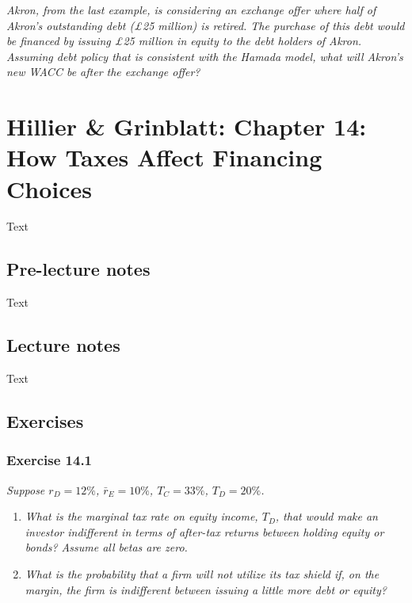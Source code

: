 \documentclass[]{book}
\theoremstyle{definition}
\theoremstyle{definition}
\theoremstyle{remark}
\begin{document}
\emph{Akron, from the last example, is considering an exchange offer
where half of Akron's outstanding debt (£25 million) is retired. The
purchase of this debt would be financed by issuing £25 million in equity
to the debt holders of Akron. Assuming debt policy that is consistent
with the Hamada model, what will Akron's new WACC be after the exchange
offer?} \citep[p.460]{book}

\chapter{Hillier \& Grinblatt: Chapter 14: How Taxes Affect Financing
Choices}\label{hillier-grinblatt-chapter-14-how-taxes-affect-financing-choices}

Text

\section{Pre-lecture notes}\label{pre-lecture-notes-13}

Text

\section{Lecture notes}\label{lecture-notes-13}

Text

\section{Exercises}\label{exercises-13}

\subsection{Exercise 14.1}\label{exercise-14.1}

\emph{Suppose \(r_D=12\%\), \(\bar{r}_E=10\%\), \(T_C=33\%\),
\(T_D=20\%\).} \citep[p.492]{book}

\begin{enumerate}
\def\labelenumi{\alph{enumi}.}
\item
  \emph{What is the marginal tax rate on equity income, \(T_D\), that
  would make an investor indifferent in terms of after-tax returns
  between holding equity or bonds? Assume all betas are zero.}
  \citep[p.492]{book}
\item
  \emph{What is the probability that a firm will not utilize its tax
  shield if, on the margin, the firm is indifferent between issuing a
  little more debt or equity?} \citep[p.492]{book}
\end{enumerate}
\end{document}
